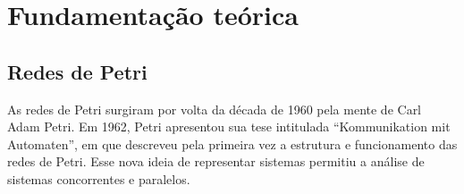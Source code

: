 \documentclass[
	12pt,				%
	openright,			%
	oneside,			%
	a4paper,			%
	english,			%
	brazil				%
	]{abntex2}
\begin{document}

\chapter{Fundamentação teórica} \label{cap:revisao-de-literatura}







\section{Redes de Petri}

As redes de Petri surgiram por volta da década de 1960 pela mente de Carl Adam Petri. Em 1962, Petri apresentou sua tese intitulada ``Kommunikation mit Automaten'', em que descreveu pela primeira vez a estrutura e funcionamento das redes de Petri. Esse nova ideia de representar sistemas permitiu a análise de sistemas concorrentes e paralelos.
\end{document}

